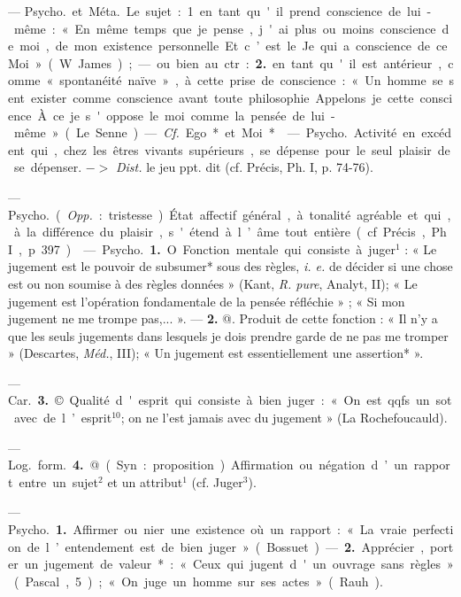 
	\begin{itemize}[leftmargin=1cm, label=, itemsep=1pt]
	
 — \si{Psycho.} et \si{Méta.} Le sujet :
1. en tant qu'il prend conscience
de lui-même : « En même temps que
je pense, j'ai plus ou moins conscience de moi, de mon existence
personnelle. Et c’est le Je qui a
conscience de ce Moi » (W. James) ;
— ou bien au ctr. : {\bf 2.} en tant qu'il
est antérieur, comme « spontanéité
naïve », à cette prise de conscience :
« Un homme se sent exister comme
conscience avant toute philosophie...
Appelons je cette conscience... À ce
je s'oppose le moi comme la pensée
de lui-même » (Le Senne). — {\it Cf.}
Ego* et Moi*.

 — \si{Psycho.} Activité
en excédent qui, chez les êtres
vivants supérieurs, se dépense pour
le seul plaisir de se dépenser. $->$
{\it Dist.} le jeu ppt. dit (cf. Précis, Ph. I,
p. 74-76).

 — \si{Psycho.} ({\it Opp.} : tristesse).
État affectif général, à tonalité
agréable et qui, à la différence du
plaisir, s'étend à l’âme tout entière
(cf. Précis, Ph. I, p. 397).

 — \si{Psycho.} {\bf 1.} O. Fonction
mentale qui consiste à juger$^1$ : « Le
jugement est le pouvoir de subsumer* sous des règles, {\it i. e.} de décider
si une chose est ou non soumise
à des règles données » (Kant, {\it R. pure},
Analyt, II); « Le jugement est
l’opération fondamentale de la
pensée réfléchie » ; « Si mon jugement ne me trompe pas,... ». —
 {\bf 2.} @. Produit de cette fonction :
« Il n’y a que les seuls jugements
dans lesquels je dois prendre garde
de ne pas me tromper » (Descartes,
\si{{\it Méd.}}, III); « Un jugement est essentiellement une assertion* ».

— \si{Car.} {\bf 3.} © Qualité d'esprit qui
consiste à bien juger : « On est qqfs.
un sot avec de l’esprit$^{10}$; on ne l’est
jamais avec du jugement » (La
Rochefoucauld).

— \si{Log.} \si{form.} {\bf 4.} @ (Syn. : proposition). Affirmation ou négation d’un
rapport entre un sujet$^2$ et un attribut$^1$
(cf. Juger$^3$).

 — \si{Psycho.} {\bf 1.} Affirmer ou nier
une existence où un rapport : « La
vraie perfection de l’entendement
est de bien juger » (Bossuet). — {\bf 2.}
Apprécier, porter un jugement de
valeur* : « Ceux qui jugent d'un
ouvrage sans règles... » (Pascal, 5) ;
« On juge un homme sur ses actes »
(Rauh).


\end{itemize}
